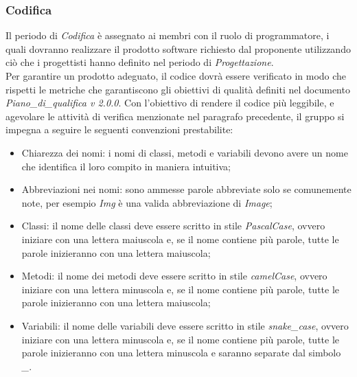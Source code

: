 	\subsubsection{Codifica}
	Il periodo di \textit{Codifica} è assegnato ai membri con il ruolo di programmatore, i quali dovranno realizzare il prodotto software richiesto dal proponente utilizzando ciò che i progettisti hanno definito nel periodo di \textit{Progettazione}.\\
	Per garantire un prodotto adeguato, il codice dovrà essere verificato in modo che rispetti le metriche che garantiscono gli obiettivi di qualità definiti nel documento \textit{Piano\_di\_qualifica v 2.0.0}.
	Con l'obiettivo di rendere il codice più leggibile, e agevolare le attività di verifica menzionate nel paragrafo precedente, il gruppo si impegna a seguire le seguenti convenzioni prestabilite: 
    \begin{itemize}
        \item Chiarezza dei nomi: i nomi di classi, metodi e variabili devono avere un nome che identifica il loro compito in maniera intuitiva;
        \item Abbreviazioni nei nomi: sono ammesse parole abbreviate solo se comunemente note, per esempio \textit{Img} è una valida abbreviazione di \textit{Image};
		\item Classi: il nome delle classi deve essere scritto in stile \textit{PascalCase}, ovvero iniziare con una lettera maiuscola e, se il nome contiene più parole, tutte le parole inizieranno con una lettera maiuscola;
		\item Metodi: il nome dei metodi deve essere scritto in stile \textit{camelCase}, ovvero iniziare con una lettera minuscola e, se il nome contiene più parole, tutte le parole inizieranno con una lettera maiuscola;
		\item Variabili: il nome delle variabili deve essere scritto in stile \textit{snake\_case}, ovvero iniziare con una lettera minuscola e, se il nome contiene più parole, tutte le parole inizieranno con una lettera minuscola e saranno separate dal simbolo \textit{\_}.
    \end{itemize}
    
